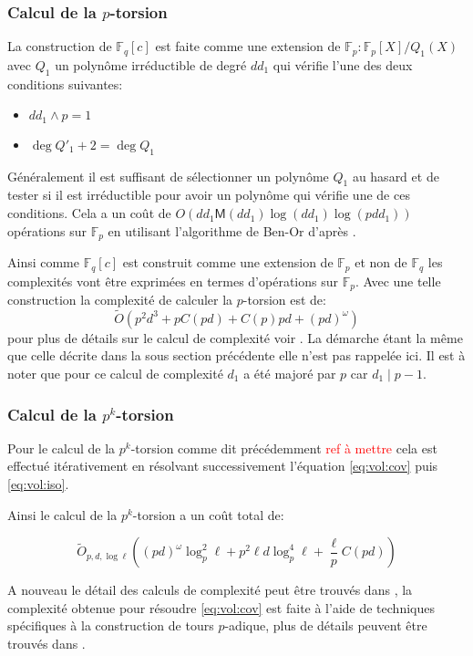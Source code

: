 \documentclass[10pt,a4paper]{book}
\theoremstyle{plain}
\theoremstyle{definition}
\theoremstyle{definition}
\theoremstyle{definition}
\theoremstyle{definition}
\theoremstyle{remark}
\theoremstyle{remark}
\theoremstyle{definition}
\begin{document}
\subsubsection{Calcul de la $p$-torsion}
La construction de $\mathbb{F}_q[c]$ est faite comme une extension de $\mathbb{F}_p:\mathbb{F}_p[X]/Q_1(X)$ avec $Q_1$ un polynôme irréductible de degré $dd_1$ qui vérifie l'une des deux conditions suivantes:
\begin{itemize}
\item $d d_1 \wedge p =1$
\item $\deg Q'_1+2 = \deg Q_1$
\end{itemize}
Généralement il est suffisant de sélectionner un polynôme $Q_1$ au hasard et de tester si il est irréductible pour avoir un polynôme qui vérifie une de ces conditions. Cela a un coût de $O(dd_1 \mathsf{M}(dd_1)\log(dd_1)\log(pdd_1))$ opérations sur $\mathbb{F}_p$ en utilisant l'algorithme de Ben-Or d'après \cite[Theoreme 14.42]{vzGJG03}.

Ainsi comme $\mathbb{F}_q[c]$ est construit comme une extension de $\mathbb{F}_p$ et non de $\mathbb{F}_q$ les complexités vont être exprimées en termes d'opérations sur $\mathbb{F}_p$. Avec une telle construction la complexité de calculer la $p$-torsion est de: 
\begin{equation*}
\tilde{O}(p^2d^3+pC(pd)+C(p)pd+(pd)^{\omega})
\end{equation*}
pour plus de détails sur le calcul de complexité voir \cite{DeFeo11}. La démarche étant la même que celle décrite dans la sous section précédente elle n'est pas rappelée ici. Il est à noter que pour ce calcul de complexité $d_1$ a été majoré par $p$ car $d_1 \mid p-1$. 

\subsubsection{Calcul de la $p^k$-torsion}
Pour le calcul de la $p^k$-torsion comme dit précédemment \textcolor{red}{ref à mettre} cela est effectué itérativement en résolvant successivement l'équation \eqref{eq:vol:cov} puis \eqref{eq:vol:iso}.

Ainsi le calcul de la $p^k$-torsion a un coût total de: 

\begin{equation*}
\tilde{O}_{p,d,\log \ell}((pd)^{\omega}\log_p^2\ell +p^2\ell d \log_p^4\ell +\frac{\ell}{p}C(pd))
\end{equation*}

A nouveau le détail des calculs de complexité peut être trouvés dans \cite{DeFeo11}, la complexité obtenue pour résoudre \eqref{eq:vol:cov} est faite à l'aide de techniques spécifiques à la construction de tours $p$-adique, plus de détails peuvent être trouvés dans \cite{DeFeo-Shost'12}.
\end{document}
